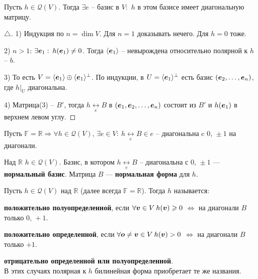 \begin{to_thr} 
	Пусть $h \in \mathcal{Q}(V)$. Тогда $\exists e$ -- базис в $V:$ $h$ в этом базисе имеет диагональную матрицу. 
\end{to_thr}

\begin{proof}[$\triangle$]
	1) Индукция по $n = \dim V$. Для $n = 1$ доказывать нечего. Для $h = 0$ тоже.

	2) $n>1$: $\exists \mbox{\boldmath $e$}_1:\: h(\mbox{\boldmath $e$}_1) \neq 0$. Тогда $\langle \mbox{\boldmath $e$}_1\rangle$ -- невырождена относительно полярной к $h$ -- $b$.

	3) То есть $V = \langle \mbox{\boldmath $e$}_1\rangle \oplus \langle \mbox{\boldmath $e$}_1\rangle^\bot$. По индукции, в $U = \langle \mbox{\boldmath $e$}_1\rangle^\bot$ есть базис $(\mbox{\boldmath $e$}_2,\ldots,\mbox{\boldmath $e$}_n)$, где $h \big|_U$ диагональна.

	4) Матрица(3) -- $B'$, тогда $h\underset{e}{\longleftrightarrow} B$ в $(\mbox{\boldmath $e$}_1,\mbox{\boldmath $e$}_2,\ldots,\mbox{\boldmath $e$}_n)$ состоит из $B'$ и $h(\mbox{\boldmath $e$}_1)$ в верхнем левом углу.
\end{proof}

\begin{to_con}
	Пусть $\mathbb{F} = \mathbb{R} \Rightarrow\forall h \in  \mathcal{Q}(V), \, \exists e \in V:\: h \underset{e}{\longleftrightarrow} B \in e$ -- диагональна c $0,\, \pm 1$ на диагонали.
\end{to_con}

\begin{to_def} 
	Над $\mathbb{R}$ $h \in \mathcal{Q}(V)$.  Базис, в котором $h \underset{e}{\longleftrightarrow} B$ -- диагональна с $0,\, \pm 1$ --- \textbf{нормальный базис}.
	Матрица $B$ --- \textbf{нормальная форма} для $h$.
\end{to_def}

\begin{to_def} 
	 Пусть $h \in \mathcal{Q}(V)$ над $\mathbb{R}$ (далее всегда \textbf{$\mathbb{F}  = \mathbb{R}$}). Тогда $h$ называется:

	  	\textbf{положительно полуопределенной},  если $\forall \mbox{\boldmath $v$} \in V\: h(\mbox{\boldmath $v$}) \geqslant 0$ $\Leftrightarrow$ на диагонали $B$ только $0,\, + 1$.

	  	\textbf{положительно определенной}, если $\forall \mbox{\boldmath $o$} \neq \mbox{\boldmath $v$} \in V\: h(\mbox{\boldmath $v$}) > 0$ $\Leftrightarrow$ на диагонали $B$ только $+ 1$. 

	  	\textbf{отрицательно определенной или полуопределенной}.\\
	  	В этих случаях полярная к $h$ билинейная форма приобретает те же названия.
\end{to_def}

